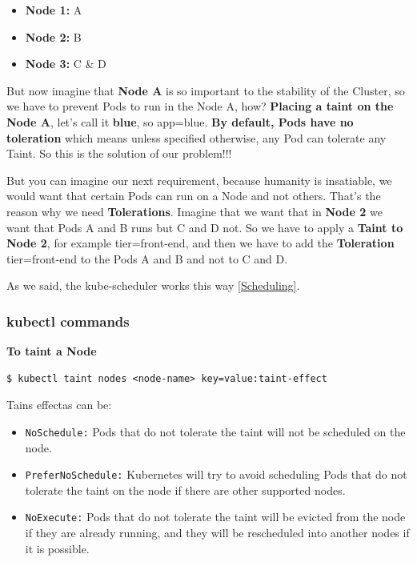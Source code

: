 \documentclass{article}
\newenvironment{codetemplate}[1][]{%
  \mybasecolorbox[#1]
  \itshape
}{%
  \endmybasecolorbox
}
\begin{document}
\begin{itemize}
    \item \textbf{Node 1:} A
    \item \textbf{Node 2:} B
    \item \textbf{Node 3:} C \& D
\end{itemize}

But now imagine that \textbf{Node A} is so important to the stability of the Cluster, so we have to prevent Pods to run in the Node A, how? \textbf{Placing a taint on the Node A}, let's call it \textbf{blue}, so app=blue. \textbf{By default, Pods have no toleration} which means unless specified otherwise, any Pod can tolerate any Taint. So this is the solution of our problem!!!

But you can imagine our next requirement, because humanity is insatiable, we would want that certain Pods can run on a Node and not others. That's the reason why we need \textbf{Tolerations}. Imagine that we want that in \textbf{Node 2} we want that Pods A and B runs but C and D not. So we have to apply a \textbf{Taint to Node 2}, for example tier=front-end, and then we have to add the \textbf{Toleration} tier=front-end to the Pods A and B and not to C and D.

As we said, the kube-scheduler works this way \ref{Scheduling}. 

\subsubsection{kubectl commands}

\textbf{To taint a Node}
\begin{codetemplate}{}
\begin{verbatim}
$ kubectl taint nodes <node-name> key=value:taint-effect
\end{verbatim}
\end{codetemplate}

Tains effectas can be:
\begin{itemize}
    \item \verb|NoSchedule:| Pods that do not tolerate the taint will not be scheduled on the node.
    \item \verb|PreferNoSchedule:| Kubernetes will try to avoid scheduling Pods that do not tolerate the taint on the node if there are other supported nodes.
    \item \verb|NoExecute:| Pods that do not tolerate the taint will be evicted from the node if they are already running, and they will be rescheduled into another nodes if it is possible.
\end{itemize}
\end{document}
